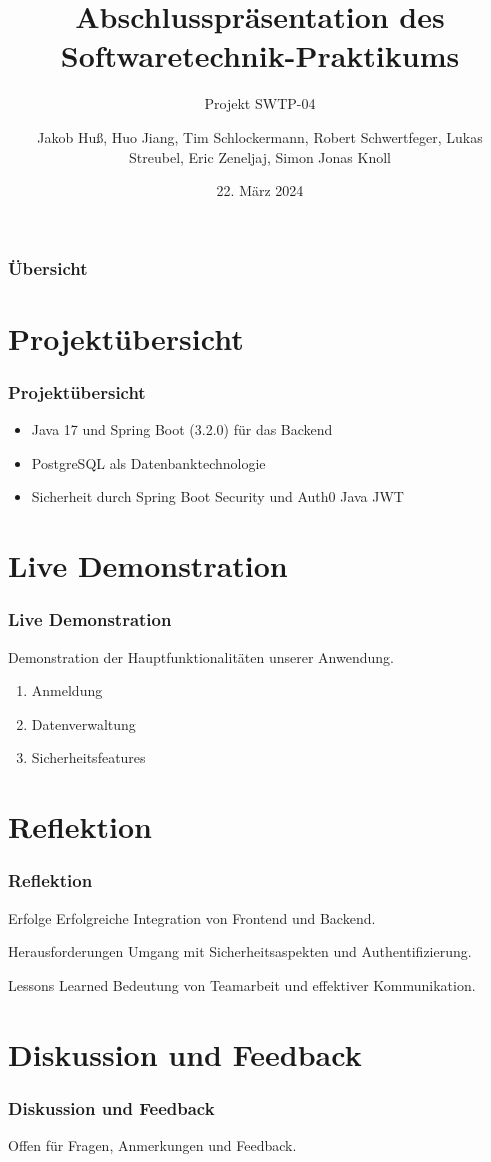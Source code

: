 \documentclass[11pt]{beamer}
\title[Abschlusspräsentation]{Abschlusspräsentation des Softwaretechnik-Praktikums}
\subtitle{Projekt SWTP-04}
\author[SWT-P 04]{Jakob Huß, Huo Jiang, Tim Schlockermann, Robert Schwertfeger, Lukas Streubel, Eric Zeneljaj, Simon Jonas Knoll}
\institute{Universität Leipzig}
\date[22.03.2024]{22. März 2024}
\begin{document}
\begin{frame}
  \titlepage
\end{frame}

\begin{frame}
  \frametitle{Übersicht}
  \tableofcontents
\end{frame}

\section{Projektübersicht}
\begin{frame}
  \frametitle{Projektübersicht}
  
  \begin{itemize}
    \item Java 17 und Spring Boot (3.2.0) für das Backend
    \item PostgreSQL als Datenbanktechnologie
    \item Sicherheit durch Spring Boot Security und Auth0 Java JWT
  \end{itemize}
\end{frame}

\section{Live Demonstration}
\begin{frame}
  \frametitle{Live Demonstration}
  
  Demonstration der Hauptfunktionalitäten unserer Anwendung.
  
  \begin{enumerate}
    \item Anmeldung
    \item Datenverwaltung
    \item Sicherheitsfeatures
  \end{enumerate}
\end{frame}

\section{Reflektion}
\begin{frame}
  \frametitle{Reflektion}
  
  \begin{block}{Erfolge}
    Erfolgreiche Integration von Frontend und Backend.
  \end{block}
  
  \begin{alertblock}{Herausforderungen}
    Umgang mit Sicherheitsaspekten und Authentifizierung.
  \end{alertblock}
  
  \begin{exampleblock}{Lessons Learned}
    Bedeutung von Teamarbeit und effektiver Kommunikation.
  \end{exampleblock}
\end{frame}

\section{Diskussion und Feedback}
\begin{frame}
  \frametitle{Diskussion und Feedback}
  
  Offen für Fragen, Anmerkungen und Feedback.
\end{frame}
\end{document}
